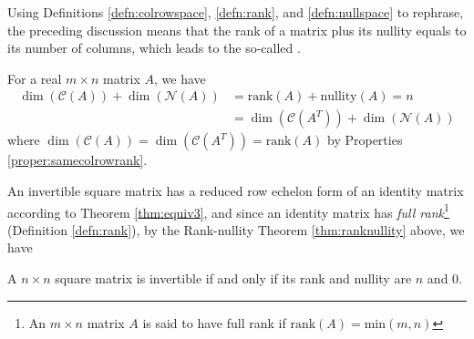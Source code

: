 Using Definitions \ref{defn:colrowspace}, \ref{defn:rank}, and \ref{defn:nullspace} to rephrase, the preceding discussion means that the rank of a matrix plus its nullity equals to its number of columns, which leads to the so-called .
\begin{thm}
\label{thm:ranknullity}
For a real $m \times n$ matrix $A$, we have
\begin{align*}
\dim(\mathcal{C}(A)) + \dim(\mathcal{N}(A)) &= \text{rank}(A) + \text{nullity}(A) = n \\
&= \dim(\mathcal{C}(A^T)) + \dim(\mathcal{N}(A))
\end{align*}
where $\dim(\mathcal{C}(A)) = \dim(\mathcal{C}(A^T)) = \text{rank}(A)$ by Properties \ref{proper:samecolrowrank}.
\end{thm}
An invertible square matrix has a reduced row echelon form of an identity matrix according to Theorem \ref{thm:equiv3}, and since an identity matrix has \textit{full rank}\footnote{An $m \times n$ matrix $A$ is said to have full rank if $\text{rank}(A) = \text{min}(m,n)$} (Definition \ref{defn:rank}), by the Rank-nullity Theorem \ref{thm:ranknullity} above, we have
\begin{proper}
\label{proper:invertrank}
A $n \times n$ square matrix is invertible if and only if its rank and nullity are $n$ and $0$. 
\end{proper}

